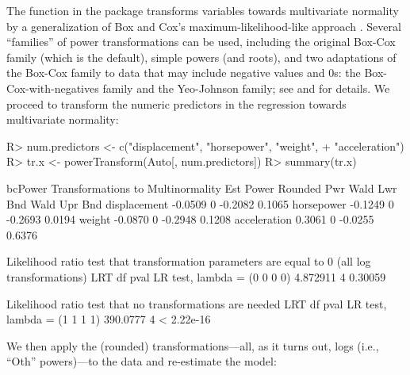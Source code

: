 \documentclass[
]{jss}
\begin{document}
The  function in the  package transforms
variables towards multivariate normality by a generalization of Box and
Cox's maximum-likelihood-like approach \citep{BoxCox:1964}. Several
``families'' of power transformations can be used, including the
original Box-Cox family (which is the default), simple powers (and
roots), and two adaptations of the Box-Cox family to data that may
include negative values and 0s: the Box-Cox-with-negatives family and
the Yeo-Johnson family; see \citet[Chap. 8]{Weisberg:2014} and
\citet[Chap. 3]{FoxWeisberg:2019} for details. We proceed to transform
the numeric predictors in the  regression towards
multivariate normality:

\begin{CodeChunk}
\begin{CodeInput}
R> num.predictors <- c("displacement", "horsepower", "weight", 
+                     "acceleration")
R> tr.x <- powerTransform(Auto[, num.predictors])
R> summary(tr.x)
\end{CodeInput}
\begin{CodeOutput}
bcPower Transformations to Multinormality 
             Est Power Rounded Pwr Wald Lwr Bnd Wald Upr Bnd
displacement   -0.0509           0      -0.2082       0.1065
horsepower     -0.1249           0      -0.2693       0.0194
weight         -0.0870           0      -0.2948       0.1208
acceleration    0.3061           0      -0.0255       0.6376

Likelihood ratio test that transformation parameters are equal to 0
 (all log transformations)
                                 LRT df    pval
LR test, lambda = (0 0 0 0) 4.872911  4 0.30059

Likelihood ratio test that no transformations are needed
                                 LRT df       pval
LR test, lambda = (1 1 1 1) 390.0777  4 < 2.22e-16
\end{CodeOutput}
\end{CodeChunk}

We then apply the (rounded) transformations---all, as it turns out, logs
(i.e., ``Oth'' powers)---to the data and re-estimate the model:

\begin{CodeChunk}
\end{CodeChunk}
\end{document}
